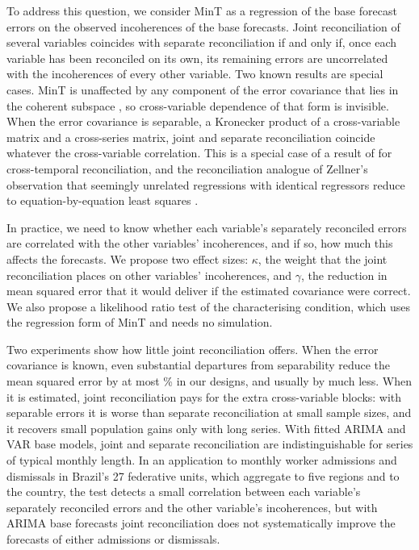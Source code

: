 To address this question, we consider MinT as a regression of the base forecast errors on the observed incoherences of the base forecasts. Joint reconciliation of several variables coincides with separate reconciliation if and only if, once each variable has been reconciled on its own, its remaining errors are uncorrelated with the incoherences of every other variable. Two known results are special cases. MinT is unaffected by any component of the error covariance that lies in the coherent subspace \citep{wickramasuriya2021properties}, so cross-variable dependence of that form is invisible. When the error covariance is separable, a Kronecker product of a cross-variable matrix and a cross-series matrix, joint and separate reconciliation coincide whatever the cross-variable correlation. This is a special case of a result of \citet{girolimetto2025cross} for cross-temporal reconciliation, and the reconciliation analogue of Zellner's observation \citep{zellner1962efficient} that seemingly unrelated regressions with identical regressors reduce to equation-by-equation least squares \citep{zellner1962efficient}.

In practice, we need to know whether each variable's separately reconciled errors are correlated with the other variables' incoherences, and if so, how much this affects the forecasts. We propose two effect sizes: $\kappa$, the weight that the joint reconciliation places on other variables' incoherences, and $\gamma$, the reduction in mean squared error that it would deliver if the estimated covariance were correct. We also propose a likelihood ratio test of the characterising condition, which uses the regression form of MinT and needs no simulation.

Two experiments show how little joint reconciliation offers. When the error covariance is known, even substantial departures from separability reduce the mean squared error by at most \gainFtwoBrazilMax\% in our designs, and usually by much less. When it is estimated, joint reconciliation pays for the extra cross-variable blocks: with separable errors it is worse than separate reconciliation at small sample sizes, and it recovers small population gains only with long series. With fitted ARIMA and VAR base models, joint and separate reconciliation are indistinguishable for series of typical monthly length. In an application to monthly worker admissions and dismissals in Brazil's 27 federative units, which aggregate to five regions and to the country, the test detects a small correlation between each variable's separately reconciled errors and the other variable's incoherences, but with ARIMA base forecasts joint reconciliation does not systematically improve the forecasts of either admissions or dismissals.

